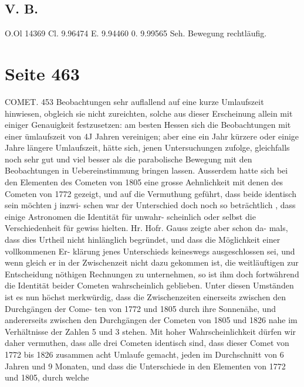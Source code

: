 \documentclass[10pt,a4paper]{article}
\begin{document}
\subsection*{V.  B.}

O.Ol  14369     Cl.
9.96474
E.
9.94460
0.
9.99565
Seh.
Bewegung  rechtläufig.

\newpage
\section*{Seite 463}

COMET.  453
Beobachtungen  sehr  auflallend  auf  eine  kurze  Umlaufszeit  hinwiesen,  obgleich  sie  nicht  zureichten,
solche  aus  dieser  Erscheinung  allein  mit  einiger  Genauigkeit  festzusetzen:  am  besten  Hessen  sich  die
Beobachtungen  mit  einer  ümlaufszeit  von  4J  Jahren  vereinigen;  aber  eine  ein  Jahr  kürzere  oder  einige
Jahre  längere  Umlaufszeit,  hätte  sich,  jenen  Untersuchungen  zufolge,  gleichfalls  noch  sehr  gut  und
viel  besser  als  die  parabolische  Bewegung  mit  den  Beobachtungen  in  Uebereinstimmung  bringen  lassen.
Ausserdem  hatte  sich  bei  den  Elementen  des  Cometen  von  1805  eine  grosse  Aehnlichkeit  mit  denen  des
Cometen  von  1772  gezeigt,  und  auf  die  Vermuthung  geführt,  dass  beide  identisch  sein  möchten j  inzwi-
schen war  der  Unterschied  doch  noch  so  beträchtlich ,  dass  einige  Astronomen  die  Identität  für  unwahr-
scheinlich oder  selbst  die  Verschiedenheit  für  gewiss  hielten.  Hr.  Hofr.  Gauss  zeigte  aber  schon  da-
mals, dass  dies  Urtheil  nicht  hinlänglich  begründet,  und  dass  die  Möglichkeit  einer  vollkommenen  Er-
klärung jenes  Unterschieds  keineswegs  ausgeschlossen  sei,  und  wenn  gleich  er  in  der  Zwischenzeit  nicht
dazu  gekommen  ist,  die  weitläuftigen  zur  Entscheidung  nöthigen  Rechnungen  zu  unternehmen,  so  ist
ihm  doch  fortwährend  die  Identität  beider  Cometen  wahrscheinlich  geblieben.  Unter  diesen  Umständen
ist  es  nun  höchst  merkwürdig,  dass  die  Zwischenzeiten  einerseits  zwischen  den  Durchgängen  der  Come-
ten von  1772  und  1805  durch  ihre  Sonnenähe,  und  andererseits  zwischen  den  Durchgängen  der  Cometen
von  1805  und  1826  nahe  im  Verhältnisse  der  Zahlen  5  und  3  stehen.
Mit  hoher  Wahrscheinlichkeit  dürfen  wir  daher  vermuthen,  dass  alle  drei  Cometen  identisch  sind,
dass  dieser  Comet  von  1772  bis  1826  zusammen  acht  Umlaufe  gemacht,  jeden  im  Durchschnitt  von  6
Jahren  und  9  Monaten,  und  dass  die  Unterschiede  in  den  Elementen  von  1772  und  1805,  durch  welche
\end{document}
